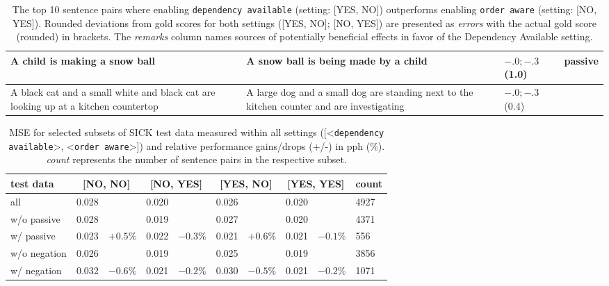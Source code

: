 \begin{table}[htb!]
\begin{tabularx}{\textwidth}{p{}|p{}|X|X}
		A child is making a snow ball & A snow ball is being made by a child & $-.0;-.3$ (1.0) & passive \\ \hline
		A black cat and a small white and black cat are looking up at a kitchen countertop & A large dog and a small dog are standing next to the kitchen counter and are investigating & $-.0;-.3$ (0.4) &  \\
		\hline \hline	
	\end{tabularx}
	\caption{The top 10 sentence pairs where enabling \texttt{dependency available} (setting: [YES, NO]) outperforms enabling \texttt{order aware} (setting: [NO, YES]). Rounded deviations from gold scores for both settings ([YES, NO]; [NO, YES]) are presented as \textit{errors} with the actual gold score (rounded) in brackets. The \textit{remarks} column names sources of potentially beneficial effects in favor of the Dependency Available setting.}
	\label{tab:results_benefit_DA}
\end{table}


\begin{table}[htb!]
	\centering
	\begin{tabularx}{\textwidth}{p{}|XX|XX|XX|XX|p{}} 
		 test data & \multicolumn{2}{c}{[NO, NO]} & \multicolumn{2}{|c|}{[NO, YES]} & \multicolumn{2}{c}{[YES, NO]} & \multicolumn{2}{|c|}{[YES, YES]} & count \\ \hline
		 all & 0.028 & & 0.020 & & 0.026 & & 0.020 & & 4927 \\ \hline
		 w/o passive & 0.028 & & 0.019 & & 0.027 & & 0.020 & & 4371 \\
		 w/ passive & 0.023 & $+0.5\%$ & 0.022 & $-0.3\%$ & 0.021 & $+0.6\%$ & 0.021 & $-0.1\%$ & 556 \\ \hline
		 w/o negation & 0.026 & & 0.019 & & 0.025 & & 0.019 & & 3856 \\
		 w/ negation & 0.032 & $-0.6\%$ & 0.021 & $-0.2\%$ & 0.030 & $-0.5\%$ & 0.021 & $-0.2\%$ & 1071 \\
	\end{tabularx}
	\caption{\ac{MSE} for selected subsets of SICK test data measured within all settings ([<\texttt{dependency available}>, <\texttt{order aware}>]) and relative performance gains/drops (+/-) in pph (\%). \textit{count} represents the number of sentence pairs in the respective subset.}
	\label{tab:mse_passive}
\end{table}

